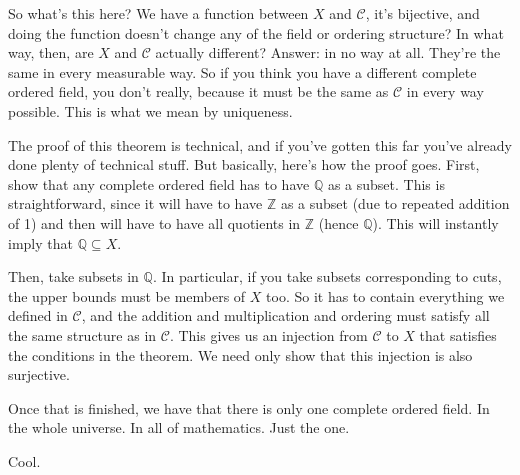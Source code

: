 \documentclass{article}
\theoremstyle{definition}
\newcommand{\Z}{\mathbb{Z}}
\newcommand{\Q}{\mathbb{Q}}
\begin{document}
So what's this here? We have a function between $X$ and $\mathcal{C}$, it's bijective, and doing the function doesn't change any of the field or ordering structure? In what way, then, are $X$ and $\mathcal{C}$ actually different? Answer: in no way at all. They're the same in every measurable way. So if you think you have a different complete ordered field, you don't really, because it must be the same as $\mathcal{C}$ in every way possible. This is what we mean by uniqueness.

The proof of this theorem is technical, and if you've gotten this far you've already done plenty of technical stuff. But basically, here's how the proof goes. First, show that any complete ordered field has to have $\Q$ as a subset. This is straightforward, since it will have to have $\Z$ as a subset (due to repeated addition of 1) and then will have to have all quotients in $\Z$ (hence $\Q$). This will instantly imply that $\Q\subseteq X$. 

Then, take subsets in $\Q$. In particular, if you take subsets corresponding to cuts, the upper bounds must be members of $X$ too. So it has to contain everything we defined in $\mathcal{C}$, and the addition and multiplication and ordering must satisfy all the same structure as in $\mathcal{C}$. This gives us an injection from $\mathcal{C}$ to $X$ that satisfies the conditions in the theorem. We need only show that this injection is also surjective.

Once that is finished, we have that there is only one complete ordered field. In the whole universe. In all of mathematics. Just the one.

Cool.
\end{document}
